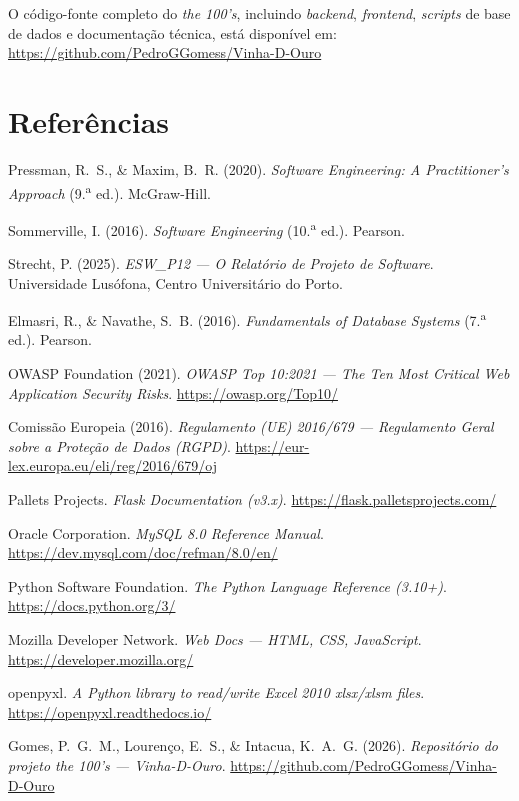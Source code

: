 \documentclass[11pt,a4paper]{report}
\begin{document}
\begin{infobox}
O código-fonte completo do \textit{the 100's}, incluindo \textit{backend}, \textit{frontend}, \textit{scripts} de base de dados e documentação técnica, está disponível em:\\[4pt]
\href{https://github.com/PedroGGomess/Vinha-D-Ouro}{https://github.com/PedroGGomess/Vinha-D-Ouro}
\end{infobox}

\chapter*{Referências}

\begin{enumerate}[label={[\arabic*]}]
  \item Pressman, R.~S., \& Maxim, B.~R. (2020). \textit{Software Engineering: A Practitioner's Approach} (9.\textsuperscript{a} ed.). McGraw-Hill.
  \item Sommerville, I. (2016). \textit{Software Engineering} (10.\textsuperscript{a} ed.). Pearson.
  \item Strecht, P. (2025). \textit{ESW\_P12 --- O Relatório de Projeto de Software}. Universidade Lusófona, Centro Universitário do Porto.
  \item Elmasri, R., \& Navathe, S.~B. (2016). \textit{Fundamentals of Database Systems} (7.\textsuperscript{a} ed.). Pearson.
  \item OWASP Foundation (2021). \textit{OWASP Top 10:2021 --- The Ten Most Critical Web Application Security Risks}. \url{https://owasp.org/Top10/}
  \item Comissão Europeia (2016). \textit{Regulamento (UE) 2016/679 --- Regulamento Geral sobre a Proteção de Dados (RGPD)}. \url{https://eur-lex.europa.eu/eli/reg/2016/679/oj}
  \item Pallets Projects. \textit{Flask Documentation (v3.x)}. \url{https://flask.palletsprojects.com/}
  \item Oracle Corporation. \textit{MySQL 8.0 Reference Manual}. \url{https://dev.mysql.com/doc/refman/8.0/en/}
  \item Python Software Foundation. \textit{The Python Language Reference (3.10+)}. \url{https://docs.python.org/3/}
  \item Mozilla Developer Network. \textit{Web Docs --- HTML, CSS, JavaScript}. \url{https://developer.mozilla.org/}
  \item openpyxl. \textit{A Python library to read/write Excel 2010 xlsx/xlsm files}. \url{https://openpyxl.readthedocs.io/}
  \item Gomes, P.~G.~M., Lourenço, E.~S., \& Intacua, K.~A.~G. (2026). \textit{Repositório do projeto the 100's --- Vinha-D-Ouro}. \url{https://github.com/PedroGGomess/Vinha-D-Ouro}
\end{enumerate}
\end{document}
